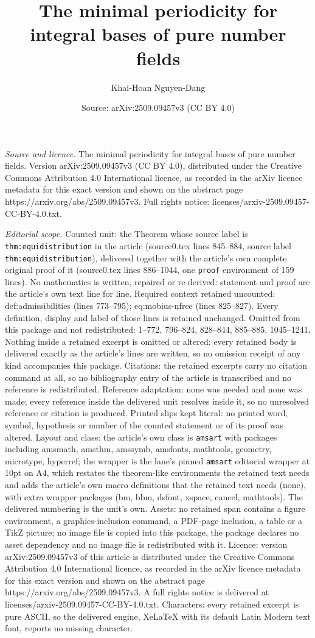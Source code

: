 \documentclass[10pt,a4paper]{amsart}
\title[The minimal periodicity for integral bases of pure number fi]{The minimal periodicity for integral bases of pure number fields}
\author{Khai-Hoan Nguyen-Dang}
\date{Source: arXiv:2509.09457v3 (CC BY 4.0)}
\begin{document}
\maketitle

\noindent\emph{Source and licence.} The minimal periodicity for integral bases of pure number fields. Version arXiv:2509.09457v3 (CC BY 4.0), distributed under the Creative Commons Attribution 4.0 International licence, as recorded in the arXiv licence metadata for this exact version and shown on the abstract page https://arxiv.org/abs/2509.09457v3. Full rights notice: licenses/arxiv-2509.09457-CC-BY-4.0.txt.\par\smallskip

\noindent\textit{Editorial scope.} Counted unit: the Theorem whose source label is \texttt{thm:equidistribution} in the article (source0.tex lines 845--884, source label \texttt{thm:equidistribution}), delivered together with the article's own complete original proof of it (source0.tex lines 886--1044, one \texttt{proof} environment of 159 lines). No mathematics is written, repaired or re-derived: statement and proof are the article's own text line for line. Required context retained uncounted: def:admissibilities (lines 773--795); eq:mobius-nfree (lines 825--827). Every definition, display and label of those lines is retained unchanged. Omitted from this package and not redistributed: 1--772, 796--824, 828--844, 885--885, 1045--1241. Nothing inside a retained excerpt is omitted or altered: every retained body is delivered exactly as the article's lines are written, so no omission receipt of any kind accompanies this package. Citations: the retained excerpts carry no citation command at all, so no bibliography entry of the article is transcribed and no reference is redistributed. Reference adaptation: none was needed and none was made; every reference inside the delivered unit resolves inside it, so no unresolved reference or citation is produced. Printed slips kept literal: no printed word, symbol, hypothesis or number of the counted statement or of its proof was altered. Layout and class: the article's own class is \texttt{amsart} with packages including amsmath, amsthm, amssymb, amsfonts, mathtools, geometry, microtype, hyperref; the wrapper is the lane's pinned \texttt{amsart} editorial wrapper at 10pt on A4, which restates the theorem-like environments the retained text needs and adds the article's own macro definitions that the retained text needs (none), with extra wrapper packages (bm, bbm, dsfont, xspace, cancel, mathtools). The delivered numbering is the unit's own. Assets: no retained span contains a figure environment, a graphics-inclusion command, a PDF-page inclusion, a table or a TikZ picture; no image file is copied into this package, the package declares no asset dependency and no image file is redistributed with it. Licence: version arXiv:2509.09457v3 of this article is distributed under the Creative Commons Attribution 4.0 International licence, as recorded in the arXiv licence metadata for this exact version and shown on the abstract page https://arxiv.org/abs/2509.09457v3. A full rights notice is delivered at licenses/arxiv-2509.09457-CC-BY-4.0.txt. Characters: every retained excerpt is pure ASCII, so the delivered engine, XeLaTeX with its default Latin Modern text font, reports no missing character.
\end{document}
